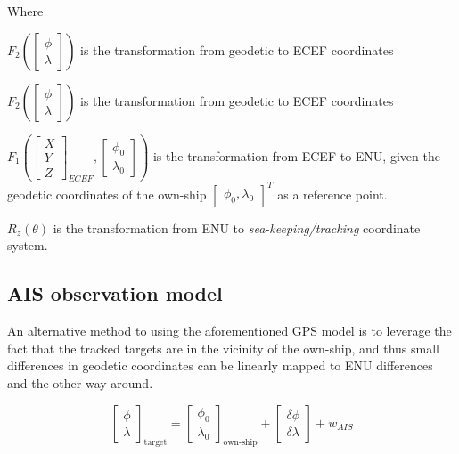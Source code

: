 Where

\begin{description}
	\item $F_2\left(\begin{bmatrix}
	\phi \\
	\lambda
	\end{bmatrix}\right)$ is the transformation from geodetic to ECEF coordinates
	\item $F_2\left(\begin{bmatrix}
	\phi \\
	\lambda
	\end{bmatrix}\right)$ is the transformation from geodetic to ECEF coordinates
	\item $F_1\left( \begin{bmatrix}
	X \\
	Y \\
	Z
	\end{bmatrix}_{ECEF},\begin{bmatrix}
	\phi_0 \\
	\lambda_0
	\end{bmatrix}\right)$ is the transformation from ECEF to ENU, given the geodetic coordinates of the own-ship $\begin{bmatrix}
	\phi_0,
	\lambda_0
	\end{bmatrix}^T$ as a reference point.
	\item $R_z(\theta)$ is the transformation from ENU to \emph{sea-keeping/tracking }coordinate system.
\end{description}

\subsection{AIS observation model}

An alternative method to using the aforementioned GPS model is to leverage the fact that the tracked targets are in the vicinity of the own-ship, and thus small differences in geodetic coordinates can be linearly mapped to ENU differences and the other way around\cite{Wellenhof1997}.



\begin{equation}
	\begin{bmatrix}
		\phi\\ \lambda
		\end{bmatrix}_{\text{target}}=
		\begin{bmatrix}
		\phi_{0}\\ \lambda_{0}
	\end{bmatrix}_{\text{own-ship}} + \begin{bmatrix}
	\delta\phi \\ \delta\lambda
	\end{bmatrix} + w_{\textit{AIS}}
\end{equation}


